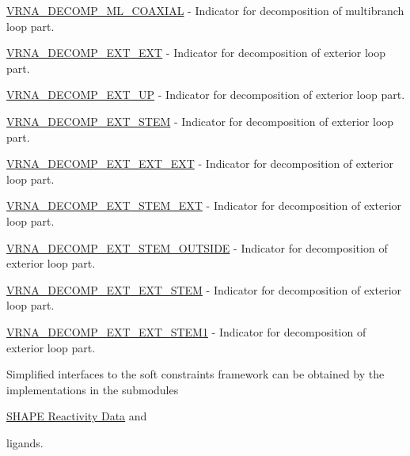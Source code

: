 \begin{DoxyItemize}
\item \hyperlink{group__constraints_ga4fe48d575830b16c208e280e01ab1497}{V\+R\+N\+A\+\_\+\+D\+E\+C\+O\+M\+P\+\_\+\+M\+L\+\_\+\+C\+O\+A\+X\+I\+AL} -\/ Indicator for decomposition of multibranch loop part.
\item \hyperlink{group__constraints_ga437adf5115c1999304eff26b41e4c9b6}{V\+R\+N\+A\+\_\+\+D\+E\+C\+O\+M\+P\+\_\+\+E\+X\+T\+\_\+\+E\+XT} -\/ Indicator for decomposition of exterior loop part.
\item \hyperlink{group__constraints_gaff1ddaffe86d984623910b40cc8a8717}{V\+R\+N\+A\+\_\+\+D\+E\+C\+O\+M\+P\+\_\+\+E\+X\+T\+\_\+\+UP} -\/ Indicator for decomposition of exterior loop part.
\item \hyperlink{group__constraints_gae44b5ace0d9b4a29088069ecb4cec441}{V\+R\+N\+A\+\_\+\+D\+E\+C\+O\+M\+P\+\_\+\+E\+X\+T\+\_\+\+S\+T\+EM} -\/ Indicator for decomposition of exterior loop part.
\item \hyperlink{group__constraints_ga803bd818b3f4b2b0a4a5cfa2f7dc2045}{V\+R\+N\+A\+\_\+\+D\+E\+C\+O\+M\+P\+\_\+\+E\+X\+T\+\_\+\+E\+X\+T\+\_\+\+E\+XT} -\/ Indicator for decomposition of exterior loop part.
\item \hyperlink{group__constraints_gabb09c5b78b75a44502fc77b950125c1e}{V\+R\+N\+A\+\_\+\+D\+E\+C\+O\+M\+P\+\_\+\+E\+X\+T\+\_\+\+S\+T\+E\+M\+\_\+\+E\+XT} -\/ Indicator for decomposition of exterior loop part.
\item \hyperlink{group__constraints_gae7554cd3ff089360c02e4920229e221c}{V\+R\+N\+A\+\_\+\+D\+E\+C\+O\+M\+P\+\_\+\+E\+X\+T\+\_\+\+S\+T\+E\+M\+\_\+\+O\+U\+T\+S\+I\+DE} -\/ Indicator for decomposition of exterior loop part.
\item \hyperlink{group__constraints_ga06efd054c9271438f6d82d4559d9e69f}{V\+R\+N\+A\+\_\+\+D\+E\+C\+O\+M\+P\+\_\+\+E\+X\+T\+\_\+\+E\+X\+T\+\_\+\+S\+T\+EM} -\/ Indicator for decomposition of exterior loop part.
\item \hyperlink{group__constraints_ga2e75d7a77118735b32f25422d9686719}{V\+R\+N\+A\+\_\+\+D\+E\+C\+O\+M\+P\+\_\+\+E\+X\+T\+\_\+\+E\+X\+T\+\_\+\+S\+T\+E\+M1} -\/ Indicator for decomposition of exterior loop part.
\end{DoxyItemize}

Simplified interfaces to the soft constraints framework can be obtained by the implementations in the submodules


\begin{DoxyItemize}
\item \hyperlink{group__SHAPE__reactivities}{S\+H\+A\+PE Reactivity Data} and
\item ligands.
\end{DoxyItemize}

